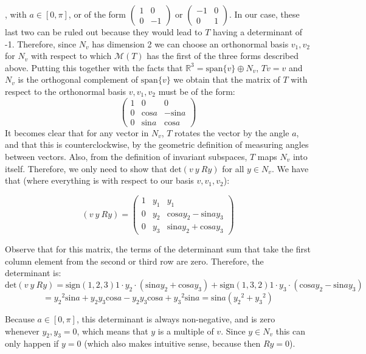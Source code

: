 \begin{solution}
    , with $a \in [0, \pi]$, or of the form $\begin{pmatrix}
        1 & 0 \\ 0 & -1
    \end{pmatrix}$ or $\begin{pmatrix}
        -1 & 0 \\ 0 & 1
    \end{pmatrix}$. In our case, these last two can be ruled out because they would lead to $T$ having a determinant of -1. Therefore, since $N_v$ has dimension 2 we can choose an orthonormal basis $v_1, v_2$ for $N_v$ with respect to which $\mathcal{M}(T)$ has the first of the three forms described above. Putting this together with the facts that $\mathbb{R}^3 = \text{span}\{v\} \oplus N_v$, $Tv = v$ and $N_v$ is the orthogonal complement of $\text{span}\{v\}$ we obtain that the matrix of $T$ with respect to the orthonormal basis $v, v_1, v_2$ must be of the form:
    $$\begin{pmatrix}
        1 & 0 & 0 \\
        0 & \text{cos} a & -\text{sin} a \\
        0 & \text{sin} a & \text{cos} a
    \end{pmatrix}$$
    It becomes clear that for any vector in $N_v$, $T$ rotates the vector by the angle $a$, and that this is counterclockwise, by the geometric definition of measuring angles between vectors. Also, from the definition of invariant subspaces, $T$ maps $N_v$ into itself. Therefore, we only need to show that $\text{det}(v \ y \ Ry)$ for all $y \in N_v$. We have that (where everything is with respect to our basis $v, v_1, v_2$):
    
    $$(v \ y \ Ry) = \begin{pmatrix}
        1 & y_1 & y_1 \\ 0 & y_2 & \text{cos} a y_2 - \text{sin} a y_3 \\ 0 & y_3 & \text{sin} a y_2 + \text{cos} a y_3
    \end{pmatrix}$$

    Observe that for this matrix, the terms of the determinant sum that take the first column element from the second or third row are zero. Therefore, the determinant is:
    $$\text{det}(v \ y \ Ry) = \text{sign}(1, 2, 3)1\cdot y_2 \cdot (\text{sin}a y_2 + \text{cos} a y_3) + \text{sign}(1, 3, 2)1 \cdot y_3 \cdot (\text{cos}a y_2 - \text{sin} a y_3)$$
    $$= {y_2}^2 \text{sin}a + y_2 y_3 \text{cos}a - y_2 y_3 \text{cos} a + {y_3}^2 \text{sin} a = \text{sin}a({y_2}^2 + {y_3}^2)$$

    Because $a \in [0, \pi]$, this determinant is always non-negative, and is zero whenever $y_2, y_3 = 0$, which means that $y$ is a multiple of $v$. Since $y \in N_v$ this can only happen if $y = 0$ (which also makes intuitive sense, because then $Ry = 0$).
\end{solution}

